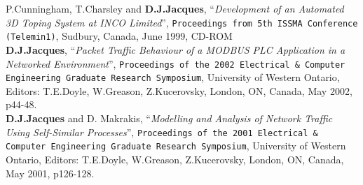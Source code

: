 P.Cunningham, T.Charsley and \textbf{D.J.Jacques}, ``\textit{Development of an Automated 3D Toping System at INCO Limited}'', \texttt{Proceedings from 5th ISSMA Conference (Telemin1)}, Sudbury, Canada, June 1999, CD-ROM\\[1.66ex]

\textbf{D.J.Jacques}, ``\textit{Packet Traffic Behaviour of a MODBUS PLC Application in a Networked Environment}'', \texttt{Proceedings of the 2002 Electrical \& Computer Engineering Graduate Research Symposium}, University of Western Ontario, Editors: T.E.Doyle, W.Greason, Z.Kucerovsky, London, ON, Canada, May 2002, p44-48.\\[1.66ex]
	
\textbf{D.J.Jacques} and D. Makrakis, ``\textit{Modelling and Analysis of Network Traffic Using Self-Similar Processes}'', \texttt{Proceedings of the 2001 Electrical \& Computer Engineering Graduate Research Symposium}, University of Western Ontario, Editors: T.E.Doyle, W.Greason, Z.Kucerovsky, London, ON, Canada, May 2001, p126-128.\\[1.66ex]


